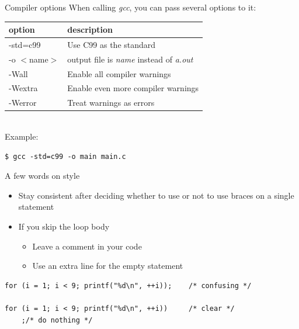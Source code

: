 \begin{frame}[fragile]{Compiler options}
	When calling \textit{gcc}, you can pass several options to it:\\
	\bigskip
	\begin{tabular}{|l|l|}
		\hline
		\textbf{option} & \textbf{description} \\\hline
		-std=c99 & Use C99 as the standard \\\hline
		-o $<$name$>$ & output file is \textit{name} instead of \textit{a.out} \\\hline
		-Wall & Enable all compiler warnings \\\hline
		-Wextra & Enable even more compiler warnings \\\hline
		-Werror & Treat warnings as errors \\\hline
	\end{tabular}\\
	\bigskip
	Example:
	\begin{lstlisting}[numbers=none]
$ gcc -std=c99 -o main main.c
\end{lstlisting}
\end{frame}

\begin{frame}[fragile]{A few words on style}
	\begin{itemize}
        \item Stay consistent after deciding whether to use or not to use braces on a single statement
		\item If you skip the loop body
		\begin{itemize}
			\item Leave a comment in your code
			\item Use an extra line for the empty statement
		\end{itemize}
	\end{itemize}
		\begin{lstlisting}[numbers=none]
for (i = 1; i < 9; printf("%d\n", ++i));    /* confusing */

for (i = 1; i < 9; printf("%d\n", ++i))     /* clear */
    ;/* do nothing */
\end{lstlisting}
\end{frame}



